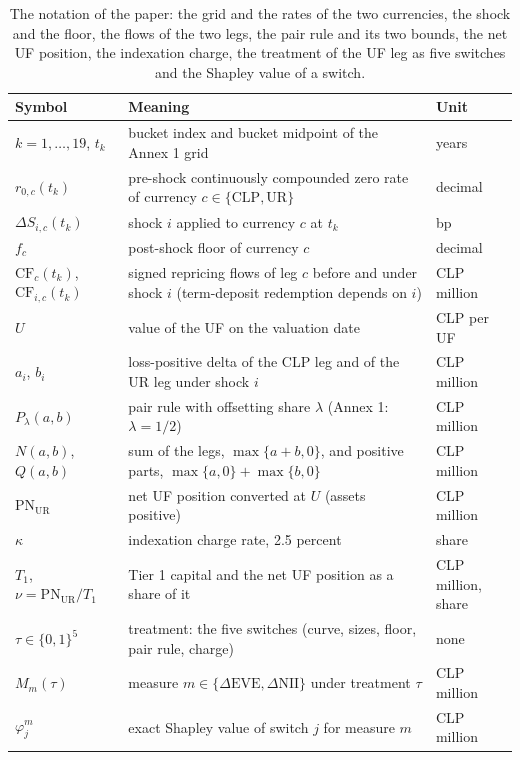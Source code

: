 \begin{table}[htbp]
\centering
\footnotesize
\setlength{\tabcolsep}{3.5pt}
\caption{The notation of the paper: the grid and the rates of the two currencies, the shock and the floor, the flows of the two legs, the pair rule and its two bounds, the net UF position, the indexation charge, the treatment of the UF leg as five switches and the Shapley value of a switch.}
\label{tab:notation}
\begin{tabular}{p{3.3cm}p{8.5cm}p{2.0cm}}
\toprule
Symbol & Meaning & Unit \\
\midrule
$k=1,\dots,19$, $t_k$ & bucket index and bucket midpoint of the Annex 1 grid & years \\
$r_{0,c}(t_k)$ & pre-shock continuously compounded zero rate of currency $c\in\{\mathrm{CLP},\mathrm{UR}\}$ & decimal \\
$\Delta S_{i,c}(t_k)$ & shock $i$ applied to currency $c$ at $t_k$ & bp \\
$f_c$ & post-shock floor of currency $c$ & decimal \\
$\mathrm{CF}_{c}(t_k)$, $\mathrm{CF}_{i,c}(t_k)$ & signed repricing flows of leg $c$ before and under shock $i$ (term-deposit redemption depends on $i$) & CLP million \\
$U$ & value of the UF on the valuation date & CLP per UF \\
$a_{i}$, $b_{i}$ & loss-positive delta of the CLP leg and of the UR leg under shock $i$ & CLP million \\
$P_\lambda(a,b)$ & pair rule with offsetting share $\lambda$ (Annex 1: $\lambda=1/2$) & CLP million \\
$N(a,b)$, $Q(a,b)$ & sum of the legs, $\max\{a+b,0\}$, and positive parts, $\max\{a,0\}+\max\{b,0\}$ & CLP million \\
$\mathrm{PN}_{\mathrm{UR}}$ & net UF position converted at $U$ (assets positive) & CLP million \\
$\kappa$ & indexation charge rate, 2.5 percent & share \\
$T_1$, $\nu=\mathrm{PN}_{\mathrm{UR}}/T_1$ & Tier 1 capital and the net UF position as a share of it & CLP million, share \\
$\tau\in\{0,1\}^5$ & treatment: the five switches (curve, sizes, floor, pair rule, charge) & none \\
$M_m(\tau)$ & measure $m\in\{\Delta\mathrm{EVE},\Delta\mathrm{NII}\}$ under treatment $\tau$ & CLP million \\
$\varphi_j^{m}$ & exact Shapley value of switch $j$ for measure $m$ & CLP million \\
\bottomrule
\end{tabular}
\end{table}
